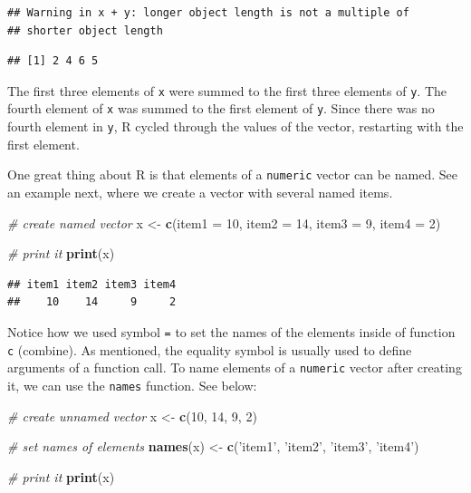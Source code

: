 \documentclass[11pt,]{book}
\newenvironment{Shaded}{\begin{snugshade}}{\end{snugshade}}
\newcommand{\KeywordTok}[1]{\textcolor[rgb]{0.27,0.27,0.27}{\textbf{#1}}}
\newcommand{\DataTypeTok}[1]{\textcolor[rgb]{0.27,0.27,0.27}{#1}}
\newcommand{\DecValTok}[1]{\textcolor[rgb]{0.06,0.06,0.06}{#1}}
\newcommand{\StringTok}[1]{\textcolor[rgb]{0.5,0.5,0.5}{#1}}
\newcommand{\CommentTok}[1]{\textcolor[rgb]{0.56,0.35,0.01}{\textit{#1}}}
\newcommand{\NormalTok}[1]{#1}
\begin{document}
\begin{verbatim}
## Warning in x + y: longer object length is not a multiple of
## shorter object length
\end{verbatim}

\begin{verbatim}
## [1] 2 4 6 5
\end{verbatim}

The first three elements of \texttt{x} were summed to the first three
elements of \texttt{y}. The fourth element of \texttt{x} was summed to
the first element of \texttt{y}. Since there was no fourth element in
\texttt{y}, R cycled through the values of the vector, restarting with
the first element.

One great thing about R is that elements of a \texttt{numeric} vector
can be named. See an example next, where we create a vector with several
named items.

\begin{Shaded}
\begin{Highlighting}[]
\CommentTok{# create named vector}
\NormalTok{x <-}\StringTok{ }\KeywordTok{c}\NormalTok{(}\DataTypeTok{item1 =} \DecValTok{10}\NormalTok{, }\DataTypeTok{item2 =} \DecValTok{14}\NormalTok{, }\DataTypeTok{item3 =} \DecValTok{9}\NormalTok{, }\DataTypeTok{item4 =} \DecValTok{2}\NormalTok{)}

\CommentTok{# print it}
\KeywordTok{print}\NormalTok{(x)}
\end{Highlighting}
\end{Shaded}

\begin{verbatim}
## item1 item2 item3 item4 
##    10    14     9     2
\end{verbatim}

Notice how we used symbol \texttt{=} to set the names of the elements
inside of function \texttt{c} (combine). As mentioned, the equality
symbol is usually used to define arguments of a function call. To name
elements of a \texttt{numeric} vector after creating it, we can use the
\texttt{names} function. See below: 

\begin{Shaded}
\begin{Highlighting}[]
\CommentTok{# create unnamed vector}
\NormalTok{x <-}\StringTok{ }\KeywordTok{c}\NormalTok{(}\DecValTok{10}\NormalTok{, }\DecValTok{14}\NormalTok{, }\DecValTok{9}\NormalTok{, }\DecValTok{2}\NormalTok{)}

\CommentTok{# set names of elements}
\KeywordTok{names}\NormalTok{(x) <-}\StringTok{ }\KeywordTok{c}\NormalTok{(}\StringTok{'item1'}\NormalTok{, }\StringTok{'item2'}\NormalTok{, }\StringTok{'item3'}\NormalTok{, }\StringTok{'item4'}\NormalTok{)}

\CommentTok{# print it}
\KeywordTok{print}\NormalTok{(x)}
\end{Highlighting}
\end{Shaded}
\end{document}
